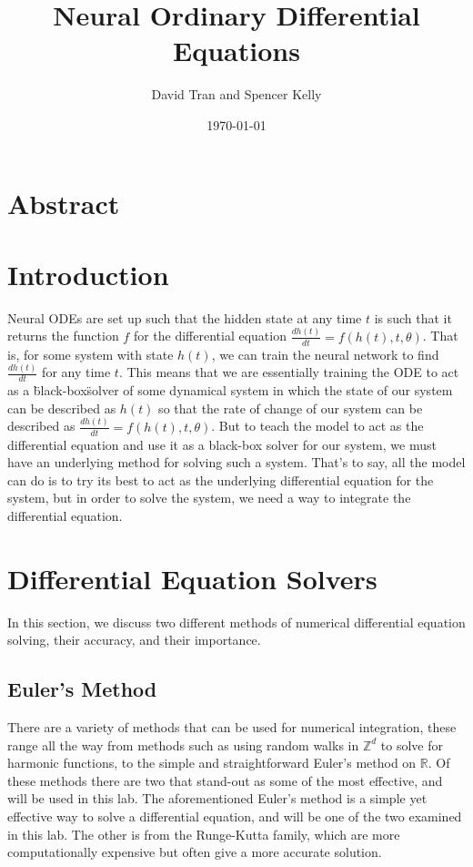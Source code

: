 \documentclass[11pt]{article}
\title{Neural Ordinary Differential Equations}
\author{David Tran and Spencer Kelly}
\date{\today}
\begin{document}
\maketitle

\section*{Abstract}

\section{Introduction}
  Neural ODEs are set up such that the hidden state at any time $t$ is such that it returns the function $f$ for the differential equation $\frac{dh(t)}{dt} = f(h(t),t,\theta)$.
  That is, for some system with state $h(t)$, we can train the neural network to find $\frac{dh(t)}{dt}$ for any time $t$.
    This means that we are essentially training the ODE to act as a \"black-box\" solver of some dynamical system in which the state of our system can be described as $h(t)$ so that the rate of change of our system can be described as $\frac{dh(t)}{dt} = f(h(t),t,\theta)$.
    But to teach the model to act as the differential equation and use it as a black-box solver for our system, we must have an underlying method for solving such a system.
    That's to say, all the model can do is to try its best to act as the underlying differential equation for the system, but in order to solve the system, we need a way to integrate the differential equation.

\section{Differential Equation Solvers}

In this section, we discuss two different methods of numerical differential equation solving, their accuracy, and their importance.

\subsection{Euler's Method}
  There are a variety of methods that can be used for numerical integration, these range all the way from methods such as using random walks in $\mathbb{Z}^d$ to solve for harmonic functions, to the simple and straightforward Euler's method on $\mathbb{R}$.
    Of these methods there are two that stand-out as some of the most effective, and will be used in this lab.
    The aforementioned Euler's method is a simple yet effective way to solve a differential equation, and will be one of the two examined in this lab.
    The other is from the Runge-Kutta family, which are more computationally expensive but often give a more accurate solution.
\end{document}
